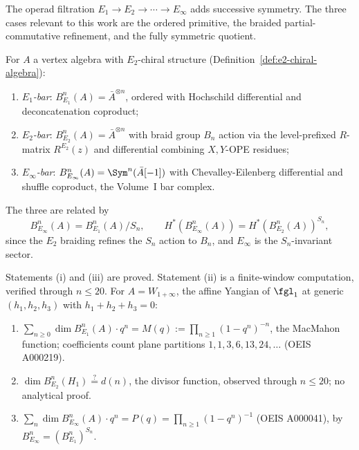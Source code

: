 The operad filtration $E_1 \to E_2 \to \cdots \to E_\infty$ adds
successive symmetry. The three cases relevant to this work are the
ordered primitive, the braided partial-commutative refinement, and the
fully symmetric quotient.

\begin{construction}
\label{constr:three-bar-complexes}
For $A$ a vertex algebra with $E_2$-chiral structure
(Definition~\ref{def:e2-chiral-algebra}):
\begin{enumerate}[label=(\roman*)]
 \item \emph{$E_1$-bar}: $B_{E_1}^n(A) = \bar{A}^{\otimes n}$,
 ordered with Hochschild differential and deconcatenation coproduct;
 \item \emph{$E_2$-bar}: $B_{E_2}^n(A) = \bar{A}^{\otimes n}$ with
 braid group $B_n$ action via the level-prefixed $R$-matrix
 $R^{E_2}(z)$ and differential combining $X,Y$-OPE residues;
 \item \emph{$E_\infty$-bar}: $B_{E_\infty}^n(A) =
 \Sym^n(\bar{A}[-1])$ with Chevalley-Eilenberg differential and
 shuffle coproduct, the Volume~I bar complex.
\end{enumerate}
The three are related by
\[
 B_{E_\infty}^n(A) = B_{E_1}^n(A) / S_n, \qquad
 H^*(B_{E_\infty}^n(A)) = H^*(B_{E_2}^n(A))^{S_n},
\]
since the $E_2$ braiding refines the $S_n$ action to $B_n$, and
$E_\infty$ is the $S_n$-invariant sector.
\end{construction}

\begin{theorem}
\label{thm:bar-comparison-c3}
Statements \textup{(i)} and \textup{(iii)} are proved. Statement \textup{(ii)} is a finite-window computation, verified through $n \leq 20$.
For $A = W_{1+\infty}$, the affine Yangian of $\fgl_1$ at generic
$(h_1,h_2,h_3)$ with $h_1+h_2+h_3=0$:
\begin{enumerate}[label=(\roman*)]
 \item $\sum_{n \geq 0} \dim B_{E_1}^n(A) \cdot q^n = M(q) :=
 \prod_{n \geq 1} (1-q^n)^{-n}$, the MacMahon function; coefficients
 count plane partitions $1,1,3,6,13,24,\ldots$ (OEIS A000219).
 \item $\dim B_{E_2}^n(H_1) \stackrel{?}{=} d(n)$, the divisor
 function, observed through $n \leq 20$; no analytical proof.
 \item $\sum_n \dim B_{E_\infty}^n(A) \cdot q^n = P(q) =
 \prod_{n \geq 1} (1-q^n)^{-1}$ (OEIS A000041), by
 $B_{E_\infty}^n = (B_{E_1}^n)^{S_n}$.
\end{enumerate}
\end{theorem}

